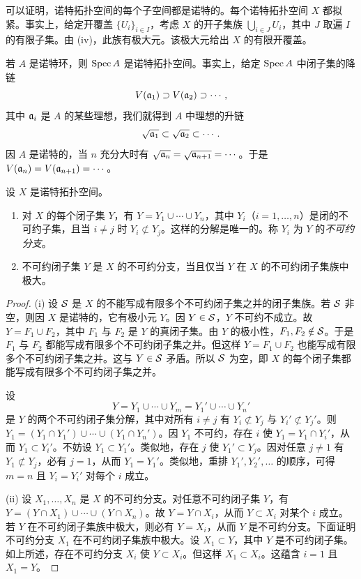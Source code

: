 可以证明，诺特拓扑空间的每个子空间都是诺特的。每个诺特拓扑空间 $X$ 都拟紧。事实上，给定开覆盖 $\{U_i\}_{i\in I}$，考虑 $X$ 的开子集族 $\bigcup_{i\in J}U_i$，其中 $J$ 取遍 $I$ 的有限子集。由 (iv)，此族有极大元。该极大元给出 $X$ 的有限开覆盖。

若 $A$ 是诺特环，则 $\operatorname{Spec} A$ 是诺特拓扑空间。事实上，给定 $\operatorname{Spec} A$ 中闭子集的降链
\[
V(\mathfrak{a}_1)\supset V(\mathfrak{a}_2)\supset\cdots,
\]
其中 $\mathfrak{a}_i$ 是 $A$ 的某些理想，我们就得到 $A$ 中理想的升链
\[
\sqrt{\mathfrak{a}_1}\subset \sqrt{\mathfrak{a}_2}\subset\cdots.
\]
因 $A$ 是诺特的，当 $n$ 充分大时有 $\sqrt{\mathfrak{a}_n}=\sqrt{\mathfrak{a}_{n+1}}=\cdots$。于是 $V(\mathfrak{a}_n)=V(\mathfrak{a}_{n+1})=\cdots$。

\begin{proposition}\label{it:1.3.4}
设 $X$ 是诺特拓扑空间。
\begin{enumerate}[label=(\roman*),leftmargin=2.8em]
  \item 对 $X$ 的每个闭子集 $Y$，有 $Y=Y_1\cup\cdots\cup Y_n$，其中 $Y_i$（$i=1,\dots,n$）是闭的不可约子集，且当 $i\ne j$ 时 $Y_i\not\subset Y_j$。这样的分解是唯一的。称 $Y_i$ 为 $Y$ 的\emph{不可约分支}。
  \item 不可约闭子集 $Y$ 是 $X$ 的不可约分支，当且仅当 $Y$ 在 $X$ 的不可约闭子集族中极大。
\end{enumerate}
\end{proposition}

\begin{proof}
(i) 设 $\mathcal{S}$ 是 $X$ 的不能写成有限多个不可约闭子集之并的闭子集族。若 $\mathcal{S}$ 非空，则因 $X$ 是诺特的，它有极小元 $Y$。因 $Y\in \mathcal{S}$，$Y$ 不可约不成立。故 $Y=F_1\cup F_2$，其中 $F_1$ 与 $F_2$ 是 $Y$ 的真闭子集。由 $Y$ 的极小性，$F_1,F_2\notin \mathcal{S}$。于是 $F_1$ 与 $F_2$ 都能写成有限多个不可约闭子集之并。但这样 $Y=F_1\cup F_2$ 也能写成有限多个不可约闭子集之并。这与 $Y\in \mathcal{S}$ 矛盾。所以 $\mathcal{S}$ 为空，即 $X$ 的每个闭子集都能写成有限多个不可约闭子集之并。

设
\[
Y=Y_1\cup\cdots\cup Y_m=Y_1'\cup\cdots\cup Y_n'
\]
是 $Y$ 的两个不可约闭子集分解，其中对所有 $i\ne j$ 有 $Y_i\not\subset Y_j$ 与 $Y_i'\not\subset Y_j'$。则 $Y_1=(Y_1\cap Y_1')\cup\cdots\cup (Y_1\cap Y_n')$。因 $Y_1$ 不可约，存在 $i$ 使 $Y_1=Y_1\cap Y_i'$，从而 $Y_1\subset Y_i'$。不妨设 $Y_1\subset Y_1'$。类似地，存在 $j$ 使 $Y_1'\subset Y_j$。因对任意 $j\ne 1$ 有 $Y_1\not\subset Y_j$，必有 $j=1$，从而 $Y_1=Y_1'$。类似地，重排 $Y_1',Y_2',\dots$ 的顺序，可得 $m=n$ 且 $Y_i=Y_i'$ 对每个 $i$ 成立。

(ii) 设 $X_1,\dots,X_n$ 是 $X$ 的不可约分支。对任意不可约闭子集 $Y$，有 $Y=(Y\cap X_1)\cup\cdots\cup (Y\cap X_n)$。故 $Y=Y\cap X_i$，从而 $Y\subset X_i$ 对某个 $i$ 成立。若 $Y$ 在不可约闭子集族中极大，则必有 $Y=X_i$，从而 $Y$ 是不可约分支。下面证明不可约分支 $X_1$ 在不可约闭子集族中极大。设 $X_1\subset Y$，其中 $Y$ 是不可约闭子集。如上所述，存在不可约分支 $X_i$ 使 $Y\subset X_i$。但这样 $X_1\subset X_i$。这蕴含 $i=1$ 且 $X_1=Y$。
\end{proof}

